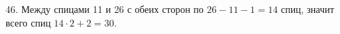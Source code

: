 46. Между спицами 11 и 26 с обеих сторон по $26-11-1=14$ спиц, значит всего спиц $14\cdot2+2=30.$\\
